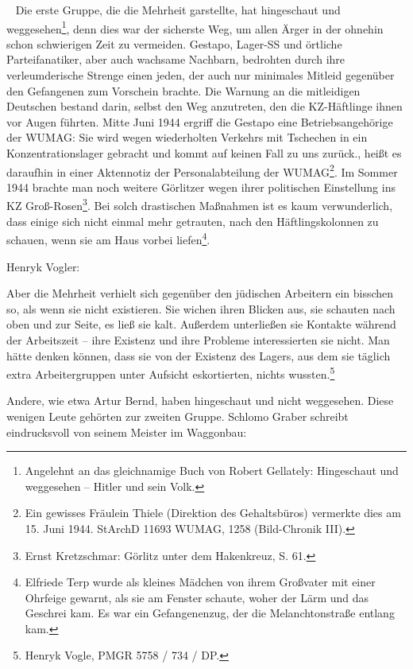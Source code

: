 \documentclass[a4paper,12pt,ngerman,
]{nisebook}
\begin{document}
~\newline
Die erste Gruppe, die die Mehrheit garstellte, hat \glqq hingeschaut und weggesehen\grqq\footnote{Angelehnt an das gleichnamige Buch von Robert Gellately: Hingeschaut und weggesehen -- Hitler und sein Volk.}, denn dies war der sicherste Weg, um allen Ärger in der ohnehin schon schwierigen Zeit zu vermeiden. Gestapo, Lager-SS und örtliche Parteifanatiker, aber auch wachsame Nachbarn, bedrohten durch ihre verleumderische Strenge einen jeden, der auch nur minimales Mitleid gegenüber den Gefangenen zum Vorschein brachte. Die Warnung an die mitleidigen Deutschen bestand darin, selbst den Weg anzutreten, den die KZ-Häftlinge ihnen vor Augen führten. Mitte Juni 1944 ergriff die Gestapo eine Betriebsangehörige der WUMAG: \glqq Sie wird wegen wiederholten Verkehrs mit Tschechen in ein Konzentrationslager gebracht und kommt auf keinen Fall zu uns zurück.\grqq, heißt es daraufhin in einer Aktennotiz der Personalabteilung der WUMAG\footnote{Ein gewisses Fräulein Thiele (Direktion des Gehaltsbüros) vermerkte dies am 15. Juni 1944. StArchD 11693 WUMAG, 1258 (Bild-Chronik III).}. Im Sommer 1944 brachte man noch weitere Görlitzer wegen ihrer politischen Einstellung ins KZ Groß-Rosen\footnote{Ernst Kretzschmar: Görlitz unter dem Hakenkreuz, S. 61.}. Bei solch drastischen Maßnahmen ist es kaum verwunderlich, dass einige sich nicht einmal mehr getrauten, nach den Häftlingskolonnen zu schauen, wenn sie am Haus vorbei liefen\footnote{Elfriede Terp wurde als kleines Mädchen von ihrem Großvater mit einer Ohrfeige gewarnt, als sie am Fenster schaute, woher der Lärm und das Geschrei kam. Es war ein Gefangenenzug, der die Melanchtonstraße entlang kam.}.

Henryk Vogler:

\begin{leftbar}
Aber die Mehrheit verhielt sich gegenüber den jüdischen Arbeitern ein bisschen so, als wenn sie nicht existieren. Sie wichen ihren Blicken aus, sie schauten nach oben und zur Seite, es ließ sie kalt. Außerdem unterließen sie Kontakte während der Arbeitszeit -- ihre Existenz und ihre Probleme interessierten sie nicht. Man hätte denken können, dass sie von der Existenz des Lagers, aus dem sie täglich extra Arbeitergruppen unter Aufsicht eskortierten, nichts wussten.\footnote{Henryk Vogle, PMGR 5758 / 734 / DP.}
\end{leftbar}

Andere, wie etwa Artur Bernd, haben \glqq hingeschaut und nicht weggesehen\grqq. Diese wenigen Leute gehörten zur zweiten Gruppe. Schlomo Graber schreibt eindrucksvoll von seinem Meister im Waggonbau:
\end{document}
